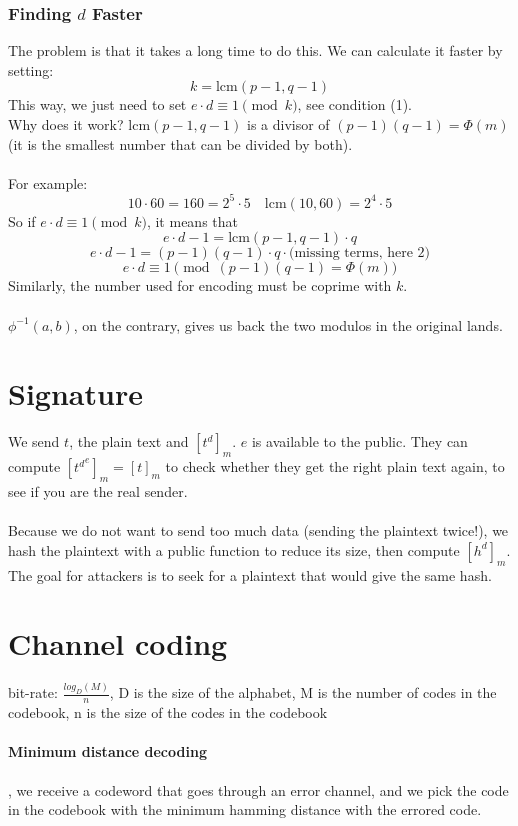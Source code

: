 \documentclass{article}
\begin{document}
\subsubsection{Finding \( d \) Faster}

The problem is that it takes a long time to do this. We can calculate it faster by setting:
\[
k = \mathrm{lcm}(p - 1, q - 1)
\]
This way, we just need to set \( e \cdot d \equiv 1 \pmod{k} \), see condition (1).\\
Why does it work? \(\mathrm{lcm}(p - 1, q-1)\) is a divisor of \((p-1)(q-1) = \Phi(m)\) (it is the smallest number that can be divided by both).\\\\
For example:
\[
10 \cdot 60 = 160 = 2^5 \cdot 5 \quad \mathrm{lcm}(10, 60) = 2^4 \cdot 5
\]
So if \( e \cdot d \equiv 1 \pmod{k} \), it means that 
\[
e \cdot d - 1 = \mathrm{lcm}(p-1, q-1) \cdot q
\]
\[
e \cdot d - 1 = (p-1)(q-1) \cdot q \cdot \text{(missing terms, here 2)}
\]
\[
e \cdot d \equiv 1 \pmod{(p-1)(q-1) = \Phi(m)}
\]
Similarly, the number used for encoding must be coprime with \( k \).\\\\
\(\phi^{-1}(a, b)\), on the contrary, gives us back the two modulos in the original lands.

\newpage

\section{Signature}

We send $t$, the plain text and $[t^d]_m$. $e$ is available to the public. They can compute $[{t^d}^e]_m = [t]_m$ to check whether they get the right plain text again, to see if you are the real sender.\\\\
Because we do not want to send too much data (sending the plaintext twice!), we hash the plaintext with a public function to reduce its size, then compute $[h^d]_m$. The goal for attackers is to seek for a plaintext that would give the same hash.

\section{Channel coding}

bit-rate: $\frac{log_D(M)}{n}$, D is the size of the alphabet, M is the number of codes in the codebook, n is the size of the codes in the codebook

\paragraph{Minimum distance decoding}, we receive a codeword that goes through an error channel, and we pick the code in the codebook with the minimum hamming distance with the errored code.
\end{document}
